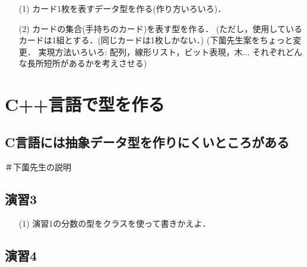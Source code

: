


\begin{enumerate}

 \item[(1)] カード1枚を表すデータ型を作る(作り方いろいろ)．

 \item[(2)] カードの集合(手持ちのカード)を表す型を作る．
(ただし，使用しているカードは1組とする．(同じカードは1枚しかない．)
(下薗先生案をちょっと変更．
実現方法いろいろ: 配列，線形リスト，ビット表現，木...
それぞれどんな長所短所があるかを考えさせる)

\end{enumerate}



\section{C++言語で型を作る}

\subsection{C言語には抽象データ型を作りにくいところがある}

＃下薗先生の説明

\subsection{演習3}

\begin{enumerate}

 \item[(1)] 演習1の分数の型をクラスを使って書きかえよ．

\end{enumerate}

\subsection{演習4}

